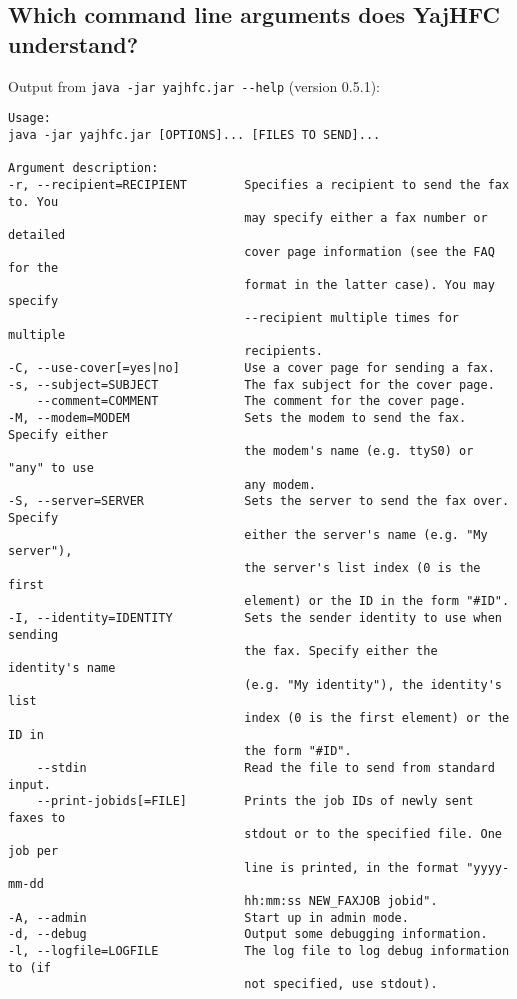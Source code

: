 \documentclass[a4paper,10pt]{scrartcl}
\begin{document}
\subsection{Which command line arguments does YajHFC understand?}

Output from \verb#java -jar yajhfc.jar --help# (version 0.5.1):
\begin{verbatim}
Usage:
java -jar yajhfc.jar [OPTIONS]... [FILES TO SEND]...

Argument description:
-r, --recipient=RECIPIENT        Specifies a recipient to send the fax to. You 
                                 may specify either a fax number or detailed 
                                 cover page information (see the FAQ for the 
                                 format in the latter case). You may specify 
                                 --recipient multiple times for multiple 
                                 recipients. 
-C, --use-cover[=yes|no]         Use a cover page for sending a fax. 
-s, --subject=SUBJECT            The fax subject for the cover page. 
    --comment=COMMENT            The comment for the cover page. 
-M, --modem=MODEM                Sets the modem to send the fax. Specify either
                                 the modem's name (e.g. ttyS0) or "any" to use 
                                 any modem. 
-S, --server=SERVER              Sets the server to send the fax over. Specify 
                                 either the server's name (e.g. "My server"), 
                                 the server's list index (0 is the first 
                                 element) or the ID in the form "#ID". 
-I, --identity=IDENTITY          Sets the sender identity to use when sending 
                                 the fax. Specify either the identity's name 
                                 (e.g. "My identity"), the identity's list 
                                 index (0 is the first element) or the ID in 
                                 the form "#ID". 
    --stdin                      Read the file to send from standard input. 
    --print-jobids[=FILE]        Prints the job IDs of newly sent faxes to 
                                 stdout or to the specified file. One job per 
                                 line is printed, in the format "yyyy-mm-dd 
                                 hh:mm:ss NEW_FAXJOB jobid". 
-A, --admin                      Start up in admin mode. 
-d, --debug                      Output some debugging information. 
-l, --logfile=LOGFILE            The log file to log debug information to (if 
                                 not specified, use stdout). 

\end{verbatim}
\end{document}
